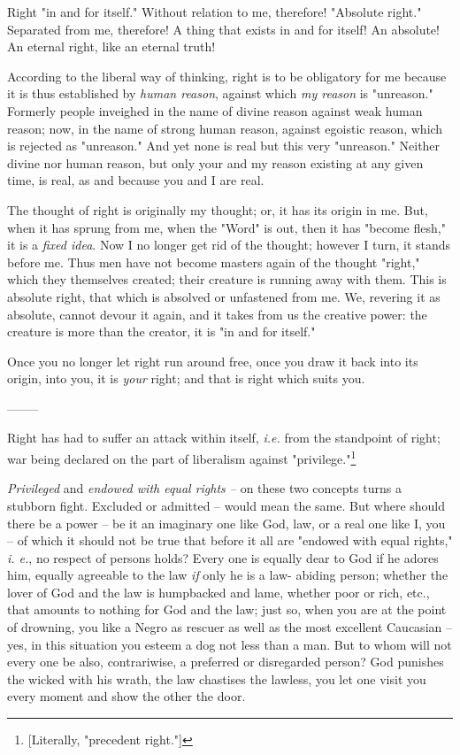 \documentclass[a4paper]{book}
\begin{document}
Right "{}in and for itself."{} Without relation to me, therefore! "{}Absolute 
right."{} Separated from me, therefore! A thing that exists in and for itself! 
An absolute! An eternal right, like an eternal truth!

According to the liberal way of thinking, right is to be obligatory for me 
because it is thus established by \textit{human reason}, against which 
\textit{my reason} is "{}unreason."{} Formerly people inveighed in the name of 
divine reason against weak human reason; now, in the name of strong human 
reason, against egoistic reason, which is rejected as "{}unreason."{} And yet 
none is real but this very "{}unreason."{} Neither divine nor human reason, 
but only your and my reason existing at any given time, is real, as and 
because you and I are real.

The thought of right is originally my thought; or, it has its origin in me. 
But, when it has sprung from me, when the "{}Word"{} is out, then it has 
"{}become flesh,"{} it is a \textit{fixed idea}. Now I no longer get rid of 
the thought; however I turn, it stands before me. Thus men have not become 
masters again of the thought "{}right,"{} which they themselves created; their 
creature is running away with them. This is absolute right, that which is 
absolved or unfastened from me. We, revering it as absolute, cannot devour it 
again, and it takes from us the creative power: the creature is more than the 
creator, it is "{}in and for itself."{}

Once you no longer let right run around free, once you draw it back into its 
origin, into you, it is \textit{your} right; and that is right which suits 
you.

\begin{center}
--------\end{center}


Right has had to suffer an attack within itself, \textit{i.e.} from the 
standpoint of right; war being declared on the part of liberalism against 
"{}privilege."{}\footnote{[Literally, "{}precedent right."{}]}

\textit{Privileged} and \textit{endowed with equal rights --} on these two 
concepts turns a stubborn fight. Excluded or admitted -- would mean the same. 
But where should there be a power -- be it an imaginary one like God, law, or 
a real one like I, you -- of which it should not be true that before it all 
are "{}endowed with equal rights,"{} \textit{i. e.}, no respect of persons 
holds? Every one is equally dear to God if he adores him, equally agreeable to 
the law \textit{if} only he is a law- abiding person; whether the lover of God 
and the law is humpbacked and lame, whether poor or rich, etc., that amounts 
to nothing for God and the law; just so, when you are at the point of 
drowning, you like a Negro as rescuer as well as the most excellent Caucasian 
-- yes, in this situation you esteem a dog not less than a man. But to whom 
will not every one be also, contrariwise, a preferred or disregarded person? 
God punishes the wicked with his wrath, the law chastises the lawless, you let 
one visit you every moment and show the other the door.
\end{document}
